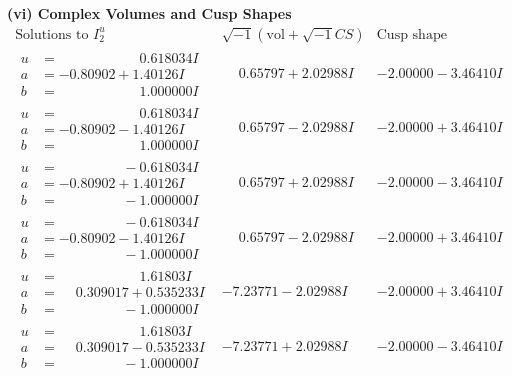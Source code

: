 \documentclass[1p]{elsarticle_modified}
\theoremstyle{definition}
\newcommand{\I}{\sqrt{-1}}
\begin{document}
\newpage\flushleft \textbf{(vi) Complex Volumes and Cusp Shapes}
$$\begin{array}{c|c|c}  
\text{Solutions to }I^u_{2}& \I (\text{vol} + \sqrt{-1}CS) & \text{Cusp shape}\\
 \hline 
\begin{aligned}
u &= \phantom{-0.000000 -}0.618034 I \\
a &= -0.80902 + 1.40126 I \\
b &= \phantom{-0.000000 -}1.000000 I\end{aligned}
 & \phantom{-}0.65797 + 2.02988 I & -2.00000 - 3.46410 I \\ \hline\begin{aligned}
u &= \phantom{-0.000000 -}0.618034 I \\
a &= -0.80902 - 1.40126 I \\
b &= \phantom{-0.000000 -}1.000000 I\end{aligned}
 & \phantom{-}0.65797 - 2.02988 I & -2.00000 + 3.46410 I \\ \hline\begin{aligned}
u &= \phantom{-0.000000 } -0.618034 I \\
a &= -0.80902 + 1.40126 I \\
b &= \phantom{-0.000000 } -1.000000 I\end{aligned}
 & \phantom{-}0.65797 + 2.02988 I & -2.00000 - 3.46410 I \\ \hline\begin{aligned}
u &= \phantom{-0.000000 } -0.618034 I \\
a &= -0.80902 - 1.40126 I \\
b &= \phantom{-0.000000 } -1.000000 I\end{aligned}
 & \phantom{-}0.65797 - 2.02988 I & -2.00000 + 3.46410 I \\ \hline\begin{aligned}
u &= \phantom{-0.000000 -}1.61803 I \\
a &= \phantom{-}0.309017 + 0.535233 I \\
b &= \phantom{-0.000000 } -1.000000 I\end{aligned}
 & -7.23771 - 2.02988 I & -2.00000 + 3.46410 I \\ \hline\begin{aligned}
u &= \phantom{-0.000000 -}1.61803 I \\
a &= \phantom{-}0.309017 - 0.535233 I \\
b &= \phantom{-0.000000 } -1.000000 I\end{aligned}
 & -7.23771 + 2.02988 I & -2.00000 - 3.46410 I \\ \hline\begin{aligned}

\end{aligned}
\end{array}$$
\end{document}
